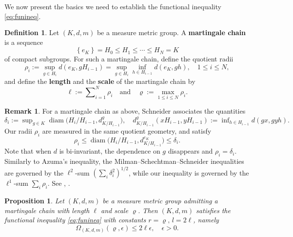 \documentclass{amsart}
\providecommand{\definitionname}{Definition}
\numberwithin{equation}{subsection}
\theoremstyle{plain}
\newtheorem{prop}[prop]{Proposition}
\theoremstyle{definition}
\newtheorem{defn}[defn]{\protect\definitionname}
\newtheorem{rem}[rem]{Remark}
\theoremstyle{plain}
\begin{document}
\smallskip

We now present the basics we need to establish the functional inequality \eqref{eq:funineq}.

\begin{defn}\label{dfn:marchain}
Let \(\left(K,d,m\right)\) be a measure metric group. A {\bf martingale chain} is a sequence
\[\left\{e_{K}\right\}=H_{0}\leq H_{1}\leq\dotsm\leq H_{N}=K\]
of compact subgroups. For such a martingale chain, define the quotient radii
\[\rho_{i}:=\sup_{g\in H_{i}}d\left(e_{K},gH_{i-1}\right)=\sup_{g\in H_{i}}\inf_{h\in H_{i-1}}d\left(e_{K},gh\right),\quad 1\leq i\leq N,\]
and define the {\bf length} and the {\bf scale} of the martingale chain by
\[\ell:=\sum\nolimits_{i=1}^{N}\rho_{i}\quad\text{and}\quad\varrho:=\max_{1\leq i\leq N}\rho_{i}.\]
\end{defn}

\begin{rem}
For a martingale chain as above, Schneider associates the quantities
\[\delta_{i}:=\sup\nolimits_{g\in K}\operatorname{diam}\big(H_{i}/H_{i-1},d^{g}_{K/H_{i-1}}\big),\quad d^{g}_{K/H_{i-1}}\left(xH_{i-1},yH_{i-1}\right):=\inf\nolimits_{h\in H_{i-1}}d\left(gx,gyh\right).\]
Our radii \(\rho_{i}\) are measured in the same quotient geometry, and satisfy
\[\rho_{i}\leq\operatorname{diam}\big(H_{i}/H_{i-1},d^{e_{K}}_{K/H_{i-1}}\big)\leq\delta_{i}.\]
Note that when \(d\) is bi-invariant, the dependence on \(g\) disappears and \(\rho_{i}=\delta_{i}\). Similarly to Azuma's inequality, the Milman--Schechtman--Schneider inequalities are governed by the \(\ell^{2}\)-sum \(\left(\sum_{i}\delta_{i}^{2}\right)^{1/2}\), while our inequality is governed by the \(\ell^{1}\)-sum \(\sum_{i}\rho_{i}\). See \cite[I, Thm.~7.12(i)]{milman1986asymptotic}, \cite[Def.~4.6, Thm.~4.8, Cor.~4.9]{schneider2023concentration}.
\end{rem}

\begin{prop}\label{prop:MSS}
Let \(\left(K,d,m\right)\) be a measure metric group admitting a martingale chain with length \(\ell\) and scale \(\varrho\). Then \(\left(K,d,m\right)\) satisfies the functional inequality \eqref{eq:funineq} with constants \(r=\varrho,\,l=2\ell\), namely
\[\Omega_{\left(K,d,m\right)}\left(\varrho,\epsilon\right)\leq2\ell\epsilon,\quad\epsilon>0.\]
\end{prop}
\end{document}
